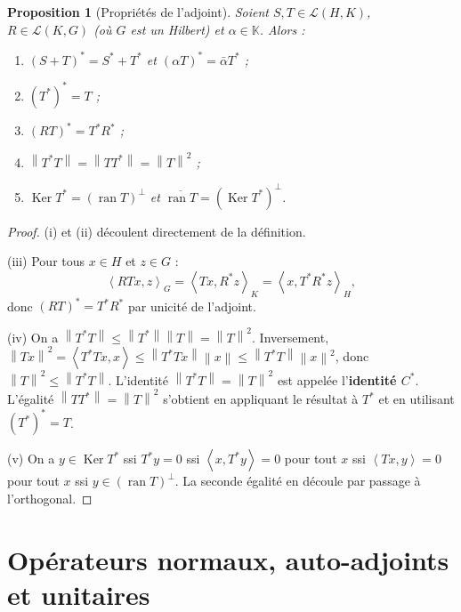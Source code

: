 \documentclass[a4paper,12pt]{book}
\DeclareMathOperator{\Ker}{Ker}
\DeclareMathOperator{\ran}{ran}
\newcommand{\K}{\mathbb{K}}
\newcommand{\norm}[1]{\left\| #1 \right\|}
\newcommand{\inner}[2]{\left\langle #1, #2 \right\rangle}
\theoremstyle{definition}
\theoremstyle{plain}
\newtheorem{proposition}[definition]{Proposition}
\theoremstyle{remark}
\begin{document}
\begin{proposition}[Propriétés de l'adjoint]\label{prop:proprietes-adjoint}
Soient $S, T \in \mathcal{L}(H,K)$, $R \in \mathcal{L}(K,G)$ (où $G$ est un Hilbert)
et $\alpha \in \K$. Alors :
\begin{enumerate}[label=(\roman*)]
    \item $(S + T)^* = S^* + T^*$ et $(\alpha T)^* = \bar{\alpha} T^*$ ;
    \item $(T^*)^* = T$ ;
    \item $(RT)^* = T^* R^*$ ;
    \item $\norm{T^*T} = \norm{TT^*} = \norm{T}^2$ ;
    \item $\Ker T^* = (\ran T)^\perp$ et
          $\overline{\ran T} = (\Ker T^*)^\perp$.
\end{enumerate}
\end{proposition}

\begin{proof}
(i) et (ii) découlent directement de la définition.

(iii) Pour tous $x \in H$ et $z \in G$ :
\[
    \inner{RTx}{z}_G = \inner{Tx}{R^*z}_K = \inner{x}{T^*R^*z}_H,
\]
donc $(RT)^* = T^*R^*$ par unicité de l'adjoint.

(iv) On a $\norm{T^*T} \leq \norm{T^*}\norm{T} = \norm{T}^2$.
Inversement, $\norm{Tx}^2 = \inner{T^*Tx}{x} \leq \norm{T^*Tx}\norm{x}
\leq \norm{T^*T}\norm{x}^2$,
donc $\norm{T}^2 \leq \norm{T^*T}$. L'identité $\norm{T^*T} = \norm{T}^2$ est
appelée l'\textbf{identité $C^*$}.
L'égalité $\norm{TT^*} = \norm{T}^2$ s'obtient en appliquant le résultat à $T^*$
et en utilisant $(T^*)^* = T$.

(v) On a $y \in \Ker T^*$ ssi $T^*y = 0$ ssi $\inner{x}{T^*y} = 0$ pour tout $x$
ssi $\inner{Tx}{y} = 0$ pour tout $x$ ssi $y \in (\ran T)^\perp$.
La seconde égalité en découle par passage à l'orthogonal.
\end{proof}


\section{Opérateurs normaux, auto-adjoints et unitaires}
\label{sec:normaux-autoadjoints-unitaires}
\end{document}
